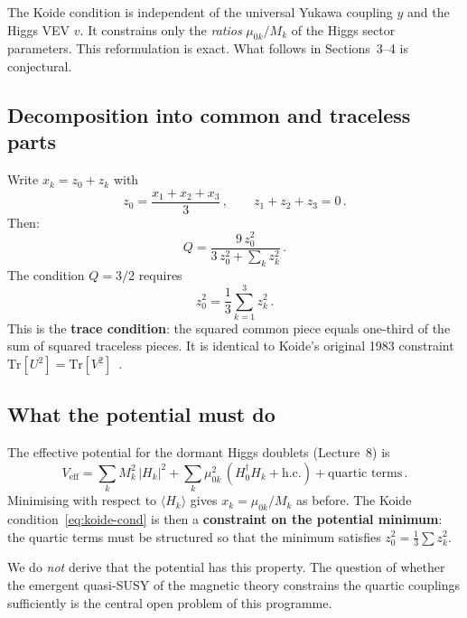 \documentclass[11pt,a4paper]{article}
\newcommand{\Tr}{\mathrm{Tr}}
\theoremstyle{definition}\newtheorem{exercise}{Exercise}[section]
\begin{document}
\begin{warningbox}
The Koide condition is independent of the universal Yukawa
coupling $y$ and the Higgs VEV $v$.  It constrains only the
\emph{ratios} $\mu_{0k}/M_k$ of the Higgs sector parameters.
This reformulation is exact.  What follows in Sections~3--4
is conjectural.
\end{warningbox}

\subsection{Decomposition into common and traceless parts}

Write $x_k = z_0 + z_k$ with
\begin{equation}
  z_0 = \frac{x_1+x_2+x_3}{3}\,,\qquad
  z_1+z_2+z_3 = 0\,.
  \label{eq:z0zk}
\end{equation}
Then:
\begin{equation}
  Q = \frac{9\,z_0^2}{3\,z_0^2 + \sum_k z_k^2}\,.
  \label{eq:Qz}
\end{equation}
The condition $Q = 3/2$ requires
\begin{equation}
  z_0^2 = \frac{1}{3}\sum_{k=1}^3 z_k^2\,.
  \label{eq:koide-cond}
\end{equation}
This is the \textbf{trace condition}: the squared common piece
equals one-third of the sum of squared traceless pieces.
It is identical to Koide's original 1983 constraint
$\Tr[U^2] = \Tr[V^2]$~\cite{Koide1983}.

\subsection{What the potential must do}

The effective potential for the dormant Higgs doublets
(Lecture~8) is
\begin{equation}
  V_{\text{eff}} = \sum_k M_k^2\,|H_k|^2
  + \sum_k \mu_{0k}^2\,(H_0^\dagger H_k + \text{h.c.})
  + \text{quartic terms}\,.
  \label{eq:Veff}
\end{equation}
Minimising with respect to $\langle H_k\rangle$ gives
$x_k = \mu_{0k}/M_k$ as before.  The Koide condition~\eqref{eq:koide-cond}
is then a \textbf{constraint on the potential minimum}:
the quartic terms must be structured so that the minimum
satisfies $z_0^2 = \frac{1}{3}\sum z_k^2$.

We do \emph{not} derive that the potential has this property.
The question of whether the emergent quasi-SUSY of the magnetic
theory constrains the quartic couplings sufficiently is the
central open problem of this programme.
\end{document}

